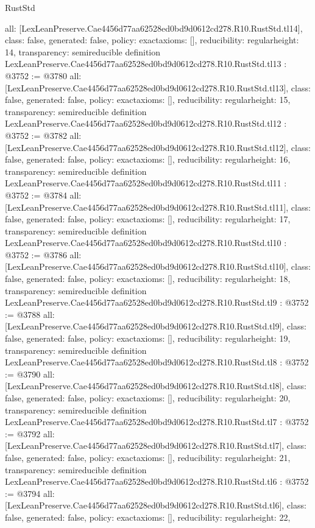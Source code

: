 \begin{lexlean}{RustStd}
\begin{coremodule}
{  all: [LexLeanPreserve.Cae4456d77aa62528ed0bd9d0612cd278.R10.RustStd.tl14],
  class: false,
  generated: false,
  policy: exact{axioms: []},
  reducibility: regular{height: 14},
  transparency: semireducible
}
definition LexLeanPreserve.Cae4456d77aa62528ed0bd9d0612cd278.R10.RustStd.tl13 : @3752 := @3780 {
  all: [LexLeanPreserve.Cae4456d77aa62528ed0bd9d0612cd278.R10.RustStd.tl13],
  class: false,
  generated: false,
  policy: exact{axioms: []},
  reducibility: regular{height: 15},
  transparency: semireducible
}
definition LexLeanPreserve.Cae4456d77aa62528ed0bd9d0612cd278.R10.RustStd.tl12 : @3752 := @3782 {
  all: [LexLeanPreserve.Cae4456d77aa62528ed0bd9d0612cd278.R10.RustStd.tl12],
  class: false,
  generated: false,
  policy: exact{axioms: []},
  reducibility: regular{height: 16},
  transparency: semireducible
}
definition LexLeanPreserve.Cae4456d77aa62528ed0bd9d0612cd278.R10.RustStd.tl11 : @3752 := @3784 {
  all: [LexLeanPreserve.Cae4456d77aa62528ed0bd9d0612cd278.R10.RustStd.tl11],
  class: false,
  generated: false,
  policy: exact{axioms: []},
  reducibility: regular{height: 17},
  transparency: semireducible
}
definition LexLeanPreserve.Cae4456d77aa62528ed0bd9d0612cd278.R10.RustStd.tl10 : @3752 := @3786 {
  all: [LexLeanPreserve.Cae4456d77aa62528ed0bd9d0612cd278.R10.RustStd.tl10],
  class: false,
  generated: false,
  policy: exact{axioms: []},
  reducibility: regular{height: 18},
  transparency: semireducible
}
definition LexLeanPreserve.Cae4456d77aa62528ed0bd9d0612cd278.R10.RustStd.tl9 : @3752 := @3788 {
  all: [LexLeanPreserve.Cae4456d77aa62528ed0bd9d0612cd278.R10.RustStd.tl9],
  class: false,
  generated: false,
  policy: exact{axioms: []},
  reducibility: regular{height: 19},
  transparency: semireducible
}
definition LexLeanPreserve.Cae4456d77aa62528ed0bd9d0612cd278.R10.RustStd.tl8 : @3752 := @3790 {
  all: [LexLeanPreserve.Cae4456d77aa62528ed0bd9d0612cd278.R10.RustStd.tl8],
  class: false,
  generated: false,
  policy: exact{axioms: []},
  reducibility: regular{height: 20},
  transparency: semireducible
}
definition LexLeanPreserve.Cae4456d77aa62528ed0bd9d0612cd278.R10.RustStd.tl7 : @3752 := @3792 {
  all: [LexLeanPreserve.Cae4456d77aa62528ed0bd9d0612cd278.R10.RustStd.tl7],
  class: false,
  generated: false,
  policy: exact{axioms: []},
  reducibility: regular{height: 21},
  transparency: semireducible
}
definition LexLeanPreserve.Cae4456d77aa62528ed0bd9d0612cd278.R10.RustStd.tl6 : @3752 := @3794 {
  all: [LexLeanPreserve.Cae4456d77aa62528ed0bd9d0612cd278.R10.RustStd.tl6],
  class: false,
  generated: false,
  policy: exact{axioms: []},
  reducibility: regular{height: 22},
}
\end{coremodule}
\end{lexlean}
